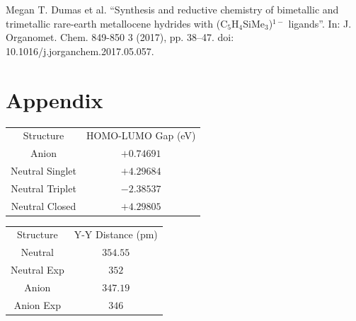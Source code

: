 \documentclass{article}
\begin{document}
\begin{thebibliography}{80}
	 Megan T. Dumas et al. “Synthesis and reductive
		chemistry of bimetallic and trimetallic rare-earth metallocene
		hydrides with (C$_5$H$_4$SiMe$_3$)$^{1-}$ ligands”. In: J.
		Organomet. Chem. 849-850 3 (2017), pp.  38–47. doi:
		10.1016/j.jorganchem.2017.05.057.
\end{thebibliography}

\section*{Appendix}
\begin{tabular}{cc}
	Structure & HOMO-LUMO Gap (eV) \\
	Anion & $+0.74691$ \\
	Neutral Singlet & $+4.29684$ \\
	Neutral Triplet & $-2.38537$ \\
	Neutral Closed & $+4.29805$
\end{tabular}

\begin{tabular}{cc}
	Structure & Y-Y Distance (pm) \\
	Neutral & $354.55$ \\
	Neutral Exp & $352$ \\
	Anion & $347.19$ \\
	Anion Exp & $346$
\end{tabular}
\end{document}
